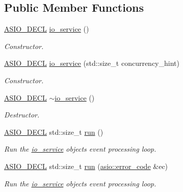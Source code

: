 \subsection*{Public Member Functions}
\begin{DoxyCompactItemize}
\item 
\hyperlink{config_8hpp_ab54d01ea04afeb9a8b39cfac467656b7}{A\+S\+I\+O\+\_\+\+D\+E\+C\+L} \hyperlink{classasio_1_1io__service_ac843d46058d711a8ce0cc5f98acc116e}{io\+\_\+service} ()
\begin{DoxyCompactList}\small\item\em Constructor. \end{DoxyCompactList}\item 
\hyperlink{config_8hpp_ab54d01ea04afeb9a8b39cfac467656b7}{A\+S\+I\+O\+\_\+\+D\+E\+C\+L} \hyperlink{classasio_1_1io__service_a0f6e8bb7dde972c571b986b32f45a3fe}{io\+\_\+service} (std\+::size\+\_\+t concurrency\+\_\+hint)
\begin{DoxyCompactList}\small\item\em Constructor. \end{DoxyCompactList}\item 
\hyperlink{config_8hpp_ab54d01ea04afeb9a8b39cfac467656b7}{A\+S\+I\+O\+\_\+\+D\+E\+C\+L} \hyperlink{classasio_1_1io__service_af4efcc148e8ff71a9ab68223db26e31f}{$\sim$io\+\_\+service} ()
\begin{DoxyCompactList}\small\item\em Destructor. \end{DoxyCompactList}\item 
\hyperlink{config_8hpp_ab54d01ea04afeb9a8b39cfac467656b7}{A\+S\+I\+O\+\_\+\+D\+E\+C\+L} std\+::size\+\_\+t \hyperlink{classasio_1_1io__service_ac84bed0d1dd061bc71010ba1228439da}{run} ()
\begin{DoxyCompactList}\small\item\em Run the \hyperlink{classasio_1_1io__service}{io\+\_\+service} object\textquotesingle{}s event processing loop. \end{DoxyCompactList}\item 
\hyperlink{config_8hpp_ab54d01ea04afeb9a8b39cfac467656b7}{A\+S\+I\+O\+\_\+\+D\+E\+C\+L} std\+::size\+\_\+t \hyperlink{classasio_1_1io__service_a2807bb48b5dc4392bb8f109aca652d57}{run} (\hyperlink{classasio_1_1error__code}{asio\+::error\+\_\+code} \&ec)
\begin{DoxyCompactList}\small\item\em Run the \hyperlink{classasio_1_1io__service}{io\+\_\+service} object\textquotesingle{}s event processing loop. \end{DoxyCompactList}\item 

\end{DoxyCompactItemize}
